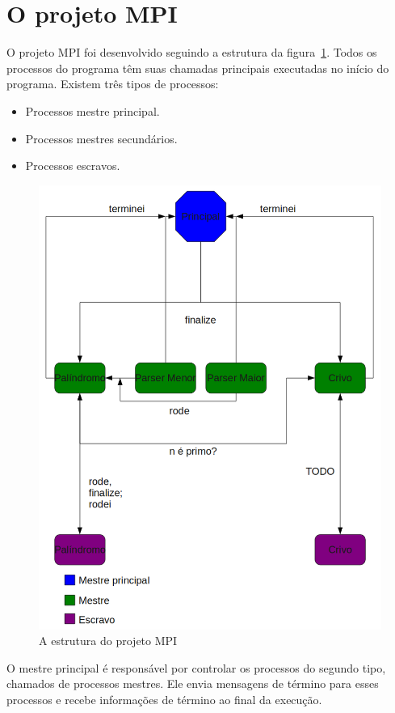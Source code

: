 \documentclass[a4paper]{article}
\begin{document}
\section{O projeto MPI}
\indent \indent O projeto MPI foi desenvolvido seguindo a estrutura da figura~\ref{mpi}. Todos os processos do programa têm suas chamadas principais executadas no início do programa. Existem três tipos de processos:
\begin{itemize}
	\item Processos mestre principal.
	\item Processos mestres secundários.
	\item Processos escravos.
\end{itemize}
\begin{figure}
	\includegraphics[scale=0.5]{mpi}
	\caption{A estrutura do projeto MPI}
	\label{mpi}
\end{figure}
\indent \indent O mestre principal é responsável por controlar os processos do segundo tipo, chamados de processos mestres. Ele envia mensagens de término para esses processos e recebe informações de término ao final da execução.
\end{document}
